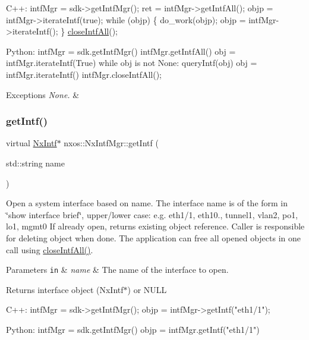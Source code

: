 \begin{DoxyCode}
C++:
   intfMgr = sdk->getIntfMgr();
   ret = intfMgr->getIntfAll();
   objp = intfMgr->iterateIntf(\textcolor{keyword}{true});
   \textcolor{keywordflow}{while} (objp) \{
        do\_work(objp);
        objp = intfMgr->iterateIntf();
   \}
   \mbox{\hyperlink{classnxos_1_1_nx_intf_mgr_a45e7cb2a8e3919667c14264dd618168a}{closeIntfAll}}();     

Python:
   intfMgr = sdk.getIntfMgr()
   intfMgr.getIntfAll()  
   obj = intfMgr.iterateIntf(True)
   \textcolor{keywordflow}{while} obj is not None:
      queryIntf(obj)
      obj = intfMgr.iterateIntf()
   intfMgr.closeIntfAll();
\end{DoxyCode}



\begin{DoxyExceptions}{Exceptions}
{\em None.} & \\
\hline
\end{DoxyExceptions}
\mbox{\label{classnxos_1_1_nx_intf_mgr_a1271144b1921be0dcb27a6aa7310bbc5}} 
\subsubsection{\texorpdfstring{get\+Intf()}{getIntf()}}
{\footnotesize\ttfamily virtual \mbox{\hyperlink{classnxos_1_1_nx_intf}{Nx\+Intf}}$\ast$ nxos\+::\+Nx\+Intf\+Mgr\+::get\+Intf (\begin{DoxyParamCaption}\item[{std\+::string}]{name }\end{DoxyParamCaption})\hspace{0.3cm}{\ttfamily [pure virtual]}}

Open a system interface based on name. The interface name is of the form in \char`\"{}show interface brief\char`\"{}, upper/lower case\+: e.\+g. eth1/1, eth10., tunnel1, vlan2, po1, lo1, mgmt0 If already open, returns existing object reference. Caller is responsible for deleting object when done. The application can free all opened objects in one call using \mbox{\hyperlink{classnxos_1_1_nx_intf_mgr_a45e7cb2a8e3919667c14264dd618168a}{close\+Intf\+All()}}. 
\begin{DoxyParams}[1]{Parameters}
\mbox{\tt in}  & {\em name} & The name of the interface to open. \\
\hline
\end{DoxyParams}
\begin{DoxyReturn}{Returns}
interface object (Nx\+Intf$\ast$) or N\+U\+LL 
\begin{DoxyCode}
C++:
   intfMgr = sdk->getIntfMgr();
   objp = intfMgr->getIntf(\textcolor{stringliteral}{"eth1/1"});

Python:
   intfMgr = sdk.getIntfMgr()
   objp = intfMgr.getIntf(\textcolor{stringliteral}{"eth1/1"})
\end{DoxyCode}

\end{DoxyReturn}


